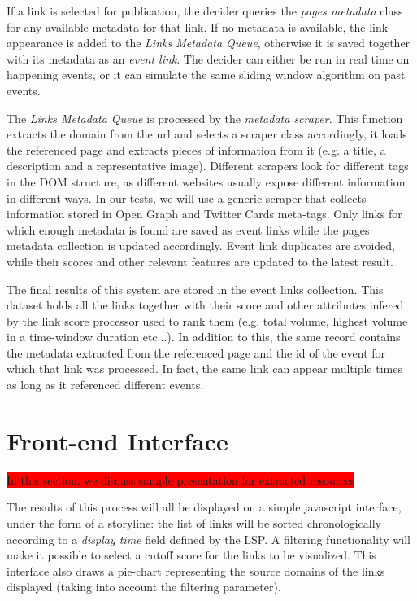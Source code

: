 \documentclass{sig-alternate}
\newcommand{\todo}[1]{\colorbox{red}{#1}}
\begin{document}
If a link is selected for publication, the decider queries the \emph{pages metadata} class for any available metadata for that link. If no metadata is available, the link appearance is added to the \emph{Links Metadata Queue}, otherwise it is saved together with its metadata as an \emph{event link}. The decider can either be run in real time on happening events, or it can simulate the same sliding window algorithm on past events.

The \emph{Links Metadata Queue} is processed by the \emph{metadata scraper}. This function extracts the domain from the url and selects a scraper class accordingly, it loads the referenced page and extracts pieces of information from it (e.g. a title, a description and a representative image). Different scrapers look for different tags in the DOM structure, as different websites usually expose different information in different ways. In our tests, we will use a generic scraper that collects information stored in Open Graph and Twitter Cards meta-tags. Only links for which enough metadata is found are saved as event links while the pages metadata collection is updated accordingly. Event link duplicates are avoided, while their scores and other relevant features are updated to the latest result.

The final results of this system are stored in the event links collection. This dataset holds all the links together with their score and other attributes infered by the link score processor used to rank them (e.g. total volume, highest volume in a time-window duration etc...). In addition to this, the same record contains the metadata extracted from the referenced page and the id of the event for which that link was processed. In fact, the same link can appear multiple times as long as it referenced different events.

\section{Front-end Interface}
\todo{In this section, we discuss sample presentation for extracted resources}

The results of this process will all be displayed on a simple javascript interface, under the form of a storyline: the list of links will be sorted chronologically according to a \emph{display time} field defined by the LSP. A filtering functionality will make it possible to select a cutoff score for the links to be visualized. This interface also draws a pie-chart representing the source domains of the links displayed (taking into account the filtering parameter).
\end{document}
